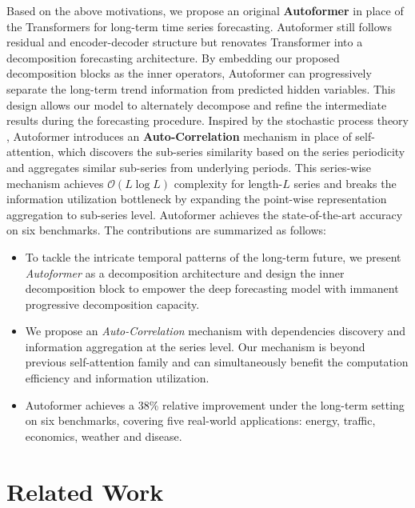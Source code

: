 Based on the above motivations, we propose an original \textbf{Autoformer} in place of the Transformers for long-term time series forecasting.
Autoformer still follows residual and encoder-decoder structure but renovates Transformer into a decomposition forecasting architecture. By embedding our proposed decomposition blocks as the inner operators, Autoformer can progressively separate the long-term trend information from predicted hidden variables. This design allows our model to alternately decompose and refine the intermediate results during the forecasting procedure. 
Inspired by the stochastic process theory \cite{Chatfield1981TheAO,Papoulis1965ProbabilityRV}, Autoformer introduces an \textbf{Auto-Correlation} mechanism in place of self-attention, which discovers the sub-series similarity based on the series periodicity and aggregates similar sub-series from underlying periods. This series-wise mechanism achieves $\mathcal{O}(L\log L)$ complexity for length-$L$ series and breaks the information utilization bottleneck by expanding the point-wise representation aggregation to sub-series level. 
Autoformer achieves the state-of-the-art accuracy on six benchmarks.
The contributions are summarized as follows:
\begin{itemize}
  \item To tackle the intricate temporal patterns of the long-term future, we present \textit{Autoformer} as a decomposition architecture and design the inner decomposition block to empower the deep forecasting model with immanent progressive decomposition capacity.
  \item We propose an \textit{Auto-Correlation} mechanism with dependencies discovery and information aggregation at the series level. Our mechanism is beyond previous self-attention family and can simultaneously benefit the computation efficiency and information utilization.
  \item Autoformer achieves a 38\% relative improvement under the long-term setting on six benchmarks, covering five real-world applications: energy, traffic, economics, weather and disease.
\end{itemize}

\vspace{-5pt}
\section{Related Work}
\vspace{-5pt}
